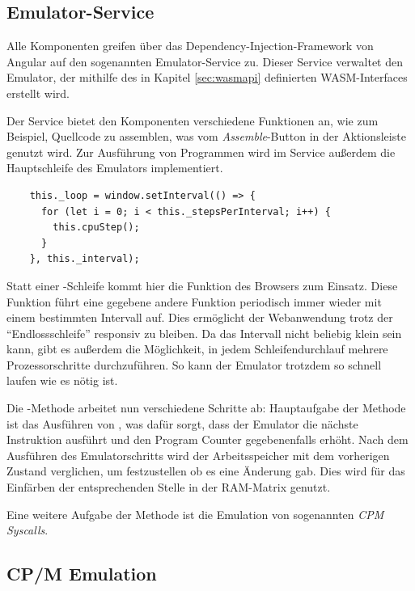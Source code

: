 \subsection{Emulator-Service}

Alle Komponenten greifen über das Dependency-Injection-Framework von Angular auf den sogenannten Emulator-Service zu. Dieser Service verwaltet den Emulator, der mithilfe des in Kapitel \ref{sec:wasmapi} definierten \ac{WASM}-Interfaces erstellt wird.

Der Service bietet den Komponenten verschiedene Funktionen an, wie zum Beispiel, Quellcode zu assemblen, was vom \textit{Assemble}-Button in der Aktionsleiste genutzt wird. Zur Ausführung von Programmen wird im Service außerdem die Hauptschleife des Emulators implementiert.

\begin{verbatim}
    this._loop = window.setInterval(() => {
      for (let i = 0; i < this._stepsPerInterval; i++) {
        this.cpuStep();
      }
    }, this._interval);
\end{verbatim}

Statt einer -Schleife kommt hier die Funktion  des Browsers zum Einsatz. Diese Funktion führt eine gegebene andere Funktion periodisch immer wieder mit einem bestimmten Intervall auf. Dies ermöglicht der Webanwendung trotz der \enquote{Endlossschleife} responsiv zu bleiben. Da das Intervall nicht beliebig klein sein kann, gibt es außerdem die Möglichkeit, in jedem Schleifendurchlauf mehrere Prozessorschritte durchzuführen. So kann der Emulator trotzdem so schnell laufen wie es nötig ist.

Die -Methode arbeitet nun verschiedene Schritte ab: Hauptaufgabe der Methode ist das Ausführen von , was dafür sorgt, dass der Emulator die nächste Instruktion ausführt und den Program Counter gegebenenfalls erhöht. Nach dem Ausführen des Emulatorschritts wird der Arbeitsspeicher mit dem vorherigen Zustand verglichen, um festzustellen ob es eine Änderung gab. Dies wird für das Einfärben der entsprechenden Stelle in der \ac{RAM}-Matrix genutzt.

Eine weitere Aufgabe der Methode ist die Emulation von sogenannten \textit{\ac{CPM} Syscalls}.

\subsection{CP/M Emulation}

